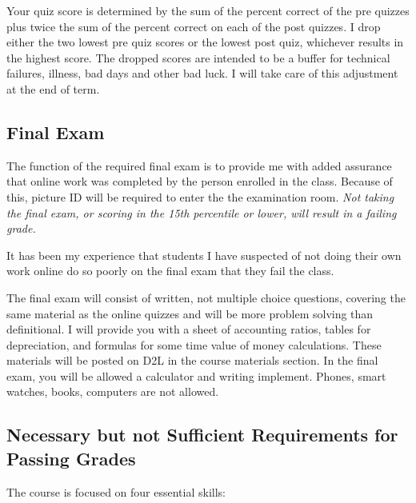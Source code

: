 \documentclass[letterpaper,10pt]{article}
\newif\ifonline
\begin{document}
\fi


Your quiz score is determined by the sum of the percent correct of the pre quizzes plus twice the sum of the percent correct on each of the post quizzes. I drop either the two lowest pre quiz scores or the lowest post quiz, whichever results in the highest score. The dropped scores are intended to be a buffer for technical
failures, illness, bad days and other bad luck.  I will take care of this adjustment at the end of term.  

\subsection{Final Exam}

The function of the required final exam is to provide me with added assurance that online work was completed by the person enrolled in the class.  Because of this, picture ID will be required to enter the the examination room.  \emph{Not taking the final exam, or scoring in the 15th percentile or lower, will result in a failing grade.}

It has been my experience that students I have suspected of not doing their own work online do so poorly on the final exam that they fail the class.

The final exam will consist of written, not multiple choice questions, covering the same material as the online quizzes and will be more problem solving than definitional. I will provide you with a sheet of accounting ratios, tables for depreciation, and formulas for some time value of money calculations.  These materials will be posted on D2L in the course materials section.  In the final exam, you will be allowed a calculator and writing implement.  Phones, smart watches, books, computers are not allowed.

\ifonline

\else
   \subsection{ Necessary but not Sufficient Requirements for Passing Grades}\label{sec:essentialSkills}
  
   The course is focused on four essential skills:
   
\end{document}
